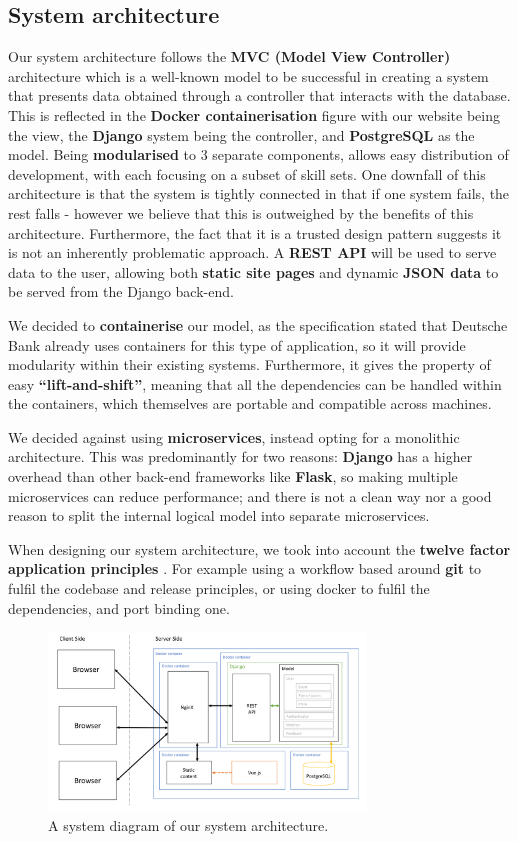 \documentclass[10pt]{article}
\begin{document}
\subsection{System architecture}
Our system architecture follows the \textbf{MVC (Model View Controller)}
architecture which is a well-known model to be successful in creating a system
that presents data obtained through a controller that interacts with the
database. This is reflected in the \textbf{Docker containerisation} figure with
our website being the view, the \textbf{Django} system being the controller, and
\textbf{PostgreSQL} as the model. Being \textbf{modularised} to 3 separate
components, allows easy distribution of development, with each focusing on a
subset of skill sets. One downfall of this architecture is that the system is
tightly connected in that if one system fails, the rest falls - however we
believe that this is outweighed by the benefits of this architecture.
Furthermore, the fact that it is a trusted design pattern suggests it is not an
inherently problematic approach. A \textbf{REST API} will be used to serve data
to the user, allowing both \textbf{static site pages} and dynamic \textbf{JSON
data} to be served from the Django back-end.

We decided to \textbf{containerise} our model, as the specification stated that
Deutsche Bank already uses containers for this type of application, so it will
provide modularity within their existing systems. Furthermore, it gives the
property of easy \textbf{``lift-and-shift''}, meaning that all the dependencies can be
handled within the containers, which themselves are portable and compatible
across machines.

We decided against using \textbf{microservices}, instead opting for a monolithic
architecture. This was predominantly for two reasons: \textbf{Django} has a
higher overhead than other back-end frameworks like \textbf{Flask}, so making
multiple microservices can reduce performance; and there is not a clean way nor
a good reason to split the internal logical model into separate microservices.

When designing our system architecture, we took into account the \textbf{twelve
factor application principles} \cite{twelveFactor}. For example using a workflow
based around \textbf{git} to fulfil the codebase and release principles, or
using docker to fulfil the dependencies, and port binding one.

\begin{figure}[H]
    \centering
    \includegraphics[width=0.75\textwidth]{architecture}
    \caption{A system diagram of our system architecture.}
    \label{fig:system_architecture_diagram}
\end{figure}
\end{document}
